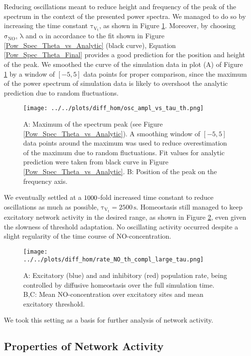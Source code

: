 \documentclass[10pt,a4paper]{article}
\begin{document}
Reducing oscillations meant to reduce height and frequency of the peak of the spectrum in the context of the presented power spectra. We managed to do so by increasing the time constant $\mathrm{\tau_{V_t}}$, as shown in Figure \ref{Peak_Prop_vs_Theta}. Moreover, by choosing $\mathrm{\sigma_{NO}}$, $\mathrm{\lambda}$ and $\mathrm{\alpha}$ in accordance to the fit shown in Figure \ref{Pow_Spec_Theta_vs_Analytic} (black curve), Equation \eqref{Pow_Spec_Theta_Final} provides a good prediction for the position and height of the peak. We smoothed the curve of the simulation data in plot (A) of Figure \ref{Peak_Prop_vs_Theta} by a window of $\mathrm{[-5,5]}$ data points for proper comparison, since the maximum of the power spectrum of simulation data is likely to overshoot the analytic prediction due to random fluctuations.  
\begin{figure}
\texttt{[image: ../../plots/diff\_hom/osc\_ampl\_vs\_tau\_th.png]}
\caption{A: Maximum of the spectrum peak (see Figure \ref{Pow_Spec_Theta_vs_Analytic}). A smoothing window of $\mathrm{[-5,5]}$ data points around the maximum was used to reduce overestimation of the maximum due to random fluctuations. Fit values for analytic prediction were taken from black curve in Figure \ref{Pow_Spec_Theta_vs_Analytic}. B: Position of the peak on the frequency axis.}
\label{Peak_Prop_vs_Theta}
\end{figure} 
We eventually settled at a $\rm 1000$-fold increased time constant to reduce oscillations as much as possible,  $\mathrm{\tau_{V_t}=2500\,s}$. Homeostasis still managed to keep excitatory network activity in the desired range, as shown in Figure \ref{full_sim_osci_slow_tau_th}, even given the slowness of threshold adaptation. No oscillating activity occurred despite a slight regularity of the time course of NO-concentration.  
\begin{figure}
\texttt{[image: ../../plots/diff\_hom/rate\_NO\_th\_compl\_large\_tau.png]}
\caption{A: Excitatory (blue) and and inhibitory (red) population rate, being controlled by diffusive homeostasis over the full simulation time. B,C: Mean NO-concentration over excitatory sites and mean excitatory threshold.}
\label{full_sim_osci_slow_tau_th}
\end{figure}
We took this setting as a basis for further analysis of network activity.

\subsection{Properties of Network Activity}
\end{document}
